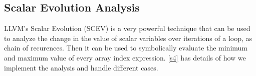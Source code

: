 \subsection{Scalar Evolution Analysis}\vspace{-5pt}
LLVM's Scalar Evolution (SCEV) is a very powerful technique
that can be used to analyze the change in 
the value of scalar variables over iterations of a loop, as chain 
of recurences. 
Then it can be used to symbolically evaluate the 
minimum and maximum value of every array index expression. 
\autoref{s4} has details 
of how we implement the analysis and handle different cases. 
